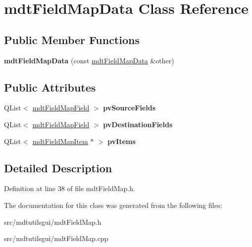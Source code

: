 \hypertarget{classmdt_field_map_data}{
\section{mdtFieldMapData Class Reference}
\label{classmdt_field_map_data}
}
\subsection*{Public Member Functions}
\begin{DoxyCompactItemize}
\item 
\hypertarget{classmdt_field_map_data_a6d0ffeb8ea676ef83975e9d5ebb1fed1}{
{\bfseries mdtFieldMapData} (const \hyperlink{classmdt_field_map_data}{mdtFieldMapData} \&other)}
\label{classmdt_field_map_data_a6d0ffeb8ea676ef83975e9d5ebb1fed1}

\end{DoxyCompactItemize}
\subsection*{Public Attributes}
\begin{DoxyCompactItemize}
\item 
\hypertarget{classmdt_field_map_data_a25c4219c0e1a5e644fb14a20b7eac635}{
QList$<$ \hyperlink{classmdt_field_map_field}{mdtFieldMapField} $>$ {\bfseries pvSourceFields}}
\label{classmdt_field_map_data_a25c4219c0e1a5e644fb14a20b7eac635}

\item 
\hypertarget{classmdt_field_map_data_a8af935f2c58513468c3d399c2c5e0223}{
QList$<$ \hyperlink{classmdt_field_map_field}{mdtFieldMapField} $>$ {\bfseries pvDestinationFields}}
\label{classmdt_field_map_data_a8af935f2c58513468c3d399c2c5e0223}

\item 
\hypertarget{classmdt_field_map_data_a541bcbaa935e5d36d05fed25120adc69}{
QList$<$ \hyperlink{classmdt_field_map_item}{mdtFieldMapItem} $\ast$ $>$ {\bfseries pvItems}}
\label{classmdt_field_map_data_a541bcbaa935e5d36d05fed25120adc69}

\end{DoxyCompactItemize}


\subsection{Detailed Description}


Definition at line 38 of file mdtFieldMap.h.



The documentation for this class was generated from the following files:\begin{DoxyCompactItemize}
\item 
src/mdtutilsgui/mdtFieldMap.h\item 
src/mdtutilsgui/mdtFieldMap.cpp\end{DoxyCompactItemize}
